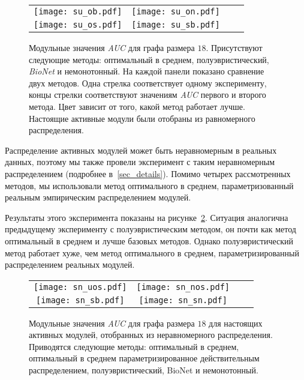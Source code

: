 \begin{figure}
    \centering
    \begin{tabular}{@{}cccc@{}}
        \texttt{[image: su\_ob.pdf]} &
        \texttt{[image: su\_on.pdf]} \\
        \texttt{[image: su\_os.pdf]} &
        \texttt{[image: su\_sb.pdf]}    
    \end{tabular}
    \caption{
        Модульные значения \emph{AUC} для графа размера $18$.  Присутствуют
        следующие методы: оптимальный в среднем, полуэвристический,
        \emph{BioNet} и немонотонный.  На каждой панели показано сравнение двух
        методов.  Одна стрелка соответствует одному эксперименту, концы стрелки
        соответствуют значениям \emph{AUC} первого и второго метода. Цвет
        зависит от того, какой метод работает лучше.  Настоящие активные модули
        были отобраны из равномерного распределения.
    }%
    \label{fig:smalluni}%
\end{figure}

Распределение активных модулей может быть неравномерным в реальных данных,
поэтому мы также провели эксперимент с таким неравномерным распределением
(подробнее в~\ref{sec_details}).  Помимо четырех рассмотренных методов, мы
использовали метод оптимального в среднем, параметризованный реальным
эмпирическим распределением модулей.

Результаты этого эксперимента показаны на рисунке~\ref{fig:smallnon}.  Ситуация
аналогична предыдущему эксперименту с полуэвристическим методом, он почти как
метод оптимальный в среднем и лучше базовых методов.  Однако полуэвристический
метод работает хуже, чем метод оптимального в среднем, параметризированный
распределением реальных модулей.

\begin{figure}
    \centering
    \begin{tabular}{@{}cccc@{}}
        \texttt{[image: sn\_uos.pdf]} &
        \texttt{[image: sn\_nos.pdf]} \\ 
        \texttt{[image: sn\_sb.pdf]} &
        \texttt{[image: sn\_sn.pdf]}    
    \end{tabular}
    \caption{
        Модульные значения \emph{AUC} для графа размера $18$ для настоящих
        активных модулей, отобранных из неравномерного распределения.
        Приводятся следующие методы: оптимальный в среднем, оптимальный
        в среднем параметризированное действительным распределением,
        полуэвристический, BioNet и немонотонный.
    }%
    \label{fig:smallnon}%
\end{figure}






